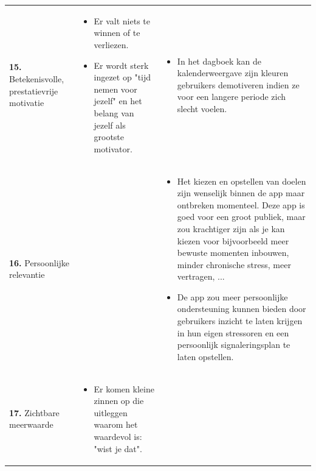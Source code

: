 {\begin{longtable}{
            >{\raggedright\arraybackslash}p{5.23cm}
            >{\raggedright\arraybackslash}p{4.93cm}
            >{\raggedright\arraybackslash}p{4.93cm}
        }
        \addlinespace[5pt]
        
        \textbf{15.} Betekenisvolle, prestatievrije motivatie 
        &
        \begin{itemize}[nosep,leftmargin=*,itemsep=10pt]
            \renewcommand{\labelitemi}{+}
            \item Er valt niets te winnen of te verliezen.
            \item Er wordt sterk ingezet op "tijd nemen voor jezelf" en het belang van jezelf als grootste motivator.
        \end{itemize}
        &
        \begin{itemize}[nosep,leftmargin=*,itemsep=10pt]
            \renewcommand{\labelitemi}{-}
            \item In het dagboek kan de kalenderweergave zijn kleuren gebruikers demotiveren indien ze voor een langere periode zich slecht voelen.
        \end{itemize}
        \\
        
        \addlinespace[5pt]
        
        \textbf{16.} Persoonlijke relevantie 
        &
        &
        \begin{itemize}[nosep,leftmargin=*,itemsep=10pt] 
            \renewcommand{\labelitemi}{-} 
            \item Het kiezen en opstellen van doelen zijn wenselijk binnen de app maar ontbreken momenteel. Deze app is goed voor een groot publiek, maar zou krachtiger zijn als je kan kiezen voor bijvoorbeeld meer bewuste momenten inbouwen, minder chronische stress, meer vertragen, ...
            \item De app zou meer persoonlijke ondersteuning kunnen bieden door gebruikers inzicht te laten krijgen in hun eigen stressoren en een persoonlijk signaleringsplan te laten opstellen.
        \end{itemize} 
        \\
        
        \addlinespace[5pt]
        
        \textbf{17.} Zichtbare meerwaarde
        &  
        \begin{itemize}[nosep,leftmargin=*,itemsep=10pt] 
            \renewcommand{\labelitemi}{+} 
            \item Er komen kleine zinnen op die uitleggen waarom het waardevol is: "wist je dat".
        \end{itemize} 
        &
        \\
        

\end{longtable}}
